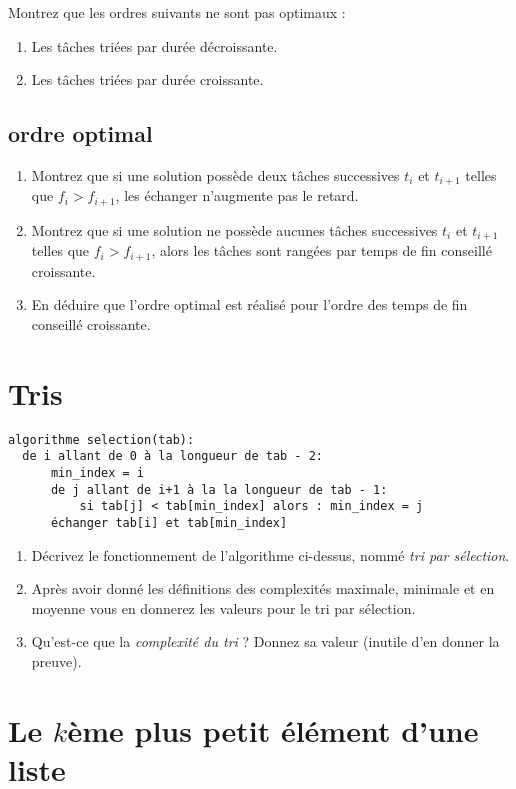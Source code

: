 \documentclass
[12pt]
{article}
\begin{document}
Montrez que les ordres suivants ne sont pas optimaux :
\begin{enumerate}
  \item Les tâches triées par durée décroissante.
  \item Les tâches triées par durée croissante.
\end{enumerate}

\subsection{ordre optimal}

\begin{enumerate}
  \item Montrez que si une solution possède deux tâches successives $t_{i}$ et $t_{i+1}$ telles que $f_{i} > f_{i+1}$, les échanger n'augmente pas le retard.
  \item Montrez que si une solution ne possède aucunes tâches successives $t_{i}$ et $t_{i+1}$ telles que $f_{i} > f_{i+1}$, alors les tâches sont rangées par temps de fin conseillé croissante.
  \item En déduire que l'ordre optimal est réalisé pour l'ordre des temps de fin conseillé croissante.
\end{enumerate}


\section{Tris\label{tri_selection}}

\begin{verbatim}
algorithme selection(tab):
  de i allant de 0 à la longueur de tab - 2:
      min_index = i
      de j allant de i+1 à la la longueur de tab - 1:
          si tab[j] < tab[min_index] alors : min_index = j
      échanger tab[i] et tab[min_index]
\end{verbatim}

\begin{enumerate}
  \item Décrivez le fonctionnement de l'algorithme ci-dessus, nommé {\em tri par sélection}.
  \item Après avoir donné les définitions des complexités maximale, minimale et en moyenne vous en donnerez les valeurs pour le tri par sélection.
  \item Qu'est-ce que la {\em complexité du tri} ? Donnez sa valeur (inutile d'en donner la preuve).
\end{enumerate}

\section{Le $k$ème plus petit élément d'une liste}
\end{document}
